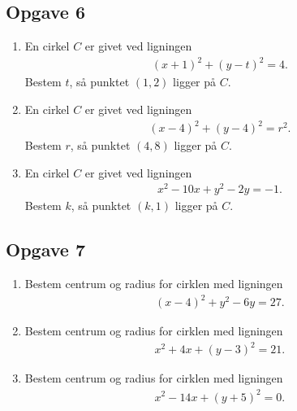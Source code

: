 \subsection*{Opgave 6}
\begin{enumerate}[label=\roman*)]
	\item En cirkel $C$ er givet ved ligningen
	\begin{align*}
		(x+1)^2+(y-t)^2 = 4.
	\end{align*}
	Bestem $t$, så punktet $(1,2)$ ligger på $C$.
	\item En cirkel $C$ er givet ved ligningen
	\begin{align*}
		(x-4)^2 + (y-4)^2 = r^2.
	\end{align*}
	Bestem $r$, så punktet $(4,8)$ ligger på $C$.
	\item En cirkel $C$ er givet ved ligningen
	\begin{align*}
		x^2-10x+y^2-2y=-1.
	\end{align*}
	Bestem $k$, så punktet $(k,1)$ ligger på $C$.
\end{enumerate}




\subsection*{Opgave 7}

\begin{enumerate}[label=\roman*)]
	\item Bestem centrum og radius for cirklen med ligningen
	\begin{align*}
		(x-4)^2+y^2-6y = 27.
	\end{align*}
	\item Bestem centrum og radius for cirklen med ligningen
	\begin{align*}
		x^2+4x+(y-3)^2 = 21.
	\end{align*}
	\item Bestem centrum og radius for cirklen med ligningen
	\begin{align*}
		x^2-14x+(y+5)^2 = 0.
	\end{align*}
\end{enumerate}